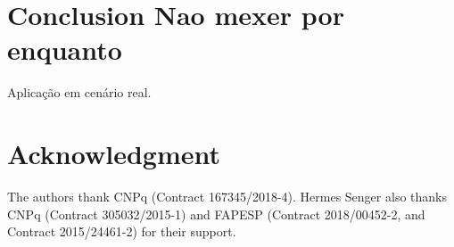 
\section{Conclusion {\color{red} Nao mexer por enquanto}} 
\label{sec:conclusion}

Aplicação em cenário real.

\section*{Acknowledgment}

The authors thank CNPq (Contract 167345/2018-4).
Hermes Senger also thanks CNPq (Contract 305032/2015-1) and FAPESP (Contract
2018/00452-2, and Contract 2015/24461-2) for their support.
